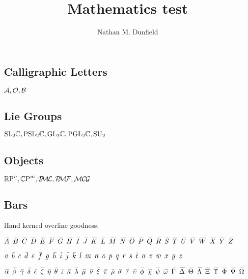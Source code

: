 \documentclass[noaddress, tikz]{nmd/article}
\title{Mathematics test}
\author{Nathan M. Dunfield}
\begin{document}
\maketitle

\subsection*{Calligraphic Letters}  ${\mathcal A}, {\mathcal O}, {\mathcal B}$

\subsection*{Lie Groups}  $\mathrm{ SL}_{2} {\mathbb C}, \mathrm{PSL}_{2} {\mathbb C}, \mathrm{GL}_{2} {\mathbb C},
\mathrm{PGL}_{2} {\mathbb C}, \mathrm{SU}_2$

\subsection*{Objects} $\RP^n, \CP^m, \PML, \PMF, \MCG$

\subsection*{Bars} Hand kerned overline goodness.  

$\Abar \enskip \Bbar \enskip \Cbar \enskip \Dbar
\enskip \Ebar \enskip \Fbar \enskip \Gbar \enskip \Hbar \enskip \Ibar
\enskip \Jbar \enskip \Kbar \enskip \Lbar \enskip \Mbar \enskip \Nbar
\enskip \Obar \enskip \Pbar \enskip \Qbar \enskip \Rbar \enskip \Sbar
\enskip \Tbar \enskip \Ubar \enskip \Vbar \enskip \Wbar \enskip \Xbar
\enskip \Ybar \enskip \Zbar$

$\abar \enskip \bbar \enskip \cbar \enskip \dbar \enskip \ebar \enskip
\fbar \enskip \gbar \enskip \hhbar \enskip \ibar \enskip \jbar \enskip \kbar
\enskip \lbar \enskip \mbar \enskip \nbar \enskip \obar \enskip \pbar
\enskip \qbar \enskip \rbar \enskip \sbar \enskip \tbar \enskip \ubar
\enskip \vbar \enskip \wbar \enskip \xbar \enskip \ybar \enskip \zbar$

$\alphabar \enskip \betabar \enskip \gammabar \enskip \deltabar \enskip \epsilonbar \enskip \zetabar \enskip \etabar \enskip \thetabar \enskip \iotabar \enskip \kappabar \enskip \lambdabar \enskip \mubar \enskip \nubar \enskip \xibar \enskip \pibar \enskip \rhobar \enskip \sigmabar \enskip \taubar \enskip \upsilonbar \enskip \phibar \enskip \chibar \enskip \psibar \enskip \omegabar \enskip \Gammabar \enskip \Deltabar \enskip \Thetabar \enskip \Lambdabar \enskip \Xibar \enskip \Upsilonbar \enskip \Phibar \enskip \Psibar \enskip \Omegabar$
\end{document}
